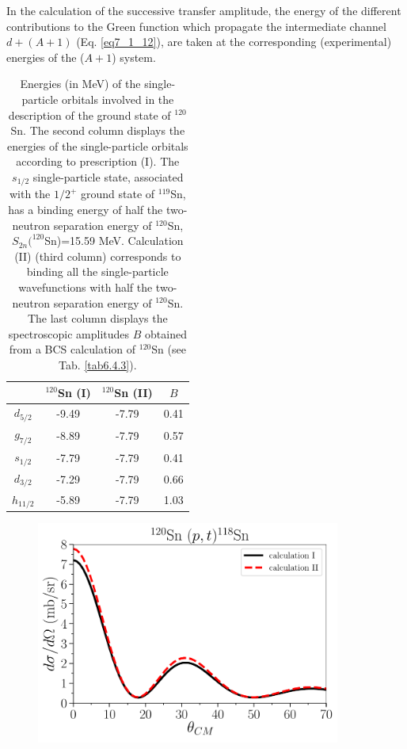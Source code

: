 \begin{subappendices}
In the calculation of the successive transfer amplitude, the energy of the different contributions to the Green function which propagate the intermediate channel $d+(A+1)$ (Eq. \ref{eq7_1_12}), are taken at the corresponding (experimental) energies of the ($A+1$) system.  
\begin{table}
	\begin{center}
	\begin{tabular}{|c|c|c|c|} 
		\hline
		& $^{120}$Sn (I) & $^{120}$Sn (II) & $B$ \\
		\hline
	$d_{5/2}$	&  -9.49 &-7.79&0.41\\
	\hline
	$g_{7/2}$	&  -8.89&-7.79&0.57\\
	\hline
	$s_{1/2}$	&  -7.79&-7.79&0.41\\
	\hline
	$d_{3/2}$	&  -7.29&-7.79&0.66\\
	\hline
	$h_{11/2}$	& -5.89 &-7.79&1.03\\
	\hline
	\end{tabular}
\end{center}
	\caption{Energies (in MeV) of the single-particle orbitals involved in the description of the ground state of $^{120}$Sn. The second column displays the energies of the single-particle orbitals according to  prescription  (I). The $s_{1/2}$ single-particle state, associated with the $1/2^+$ ground state of $^{119}$Sn, has a binding energy of half the two-neutron separation energy of $^{120}$Sn, $S_{2n}(^{120}$Sn)=15.59 MeV. Calculation (II) (third column) corresponds to binding all the single-particle wavefunctions with half the two-neutron separation energy of $^{120}$Sn. The last column displays the spectroscopic amplitudes $B$ obtained from a BCS calculation of  $^{120}$Sn (see Tab. \ref{tab6.4.3}).}\label{Tab7.C.1}
\end{table}
        \begin{figure}
	\centerline{\includegraphics*[width=10cm,angle=0]{C8/figsC8/120Sn_pt}}

\end{figure}
\end{subappendices}
